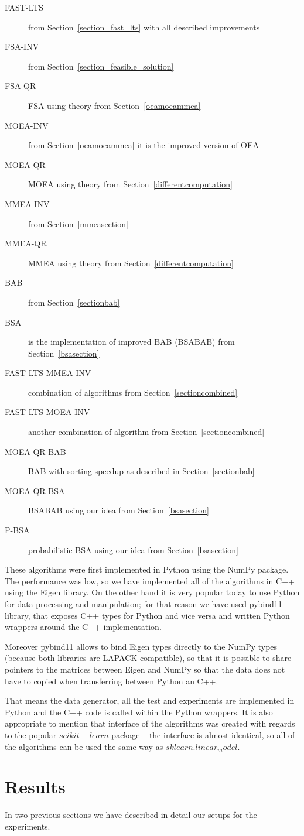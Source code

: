 \begin{description}
    \item[FAST-LTS] from Section~\ref{section_fast_lts} with all described improvements
    \item[FSA-INV] from Section~\ref{section_feasible_solution}
    \item[FSA-QR] FSA using theory from Section~\ref{oeamoeammea}
    \item[MOEA-INV] from Section~\ref{oeamoeammea} it is the improved version of OEA
    \item[MOEA-QR] MOEA using theory from Section~\ref{differentcomputation}
    \item[MMEA-INV] from Section~\ref{mmeasection}
    \item[MMEA-QR] MMEA using theory from Section~\ref{differentcomputation}
    \item[BAB] from Section~\ref{sectionbab}
    \item[BSA] is the implementation of improved BAB (BSABAB) from Section~\ref{bsasection}
    \item[FAST-LTS-MMEA-INV] combination of algorithms from Section~\ref{sectioncombined}
    \item[FAST-LTS-MOEA-INV] another combination of algorithm from Section~\ref{sectioncombined}
    \item[MOEA-QR-BAB] BAB with sorting speedup as described in Section~\ref{sectionbab}
    \item[MOEA-QR-BSA] BSABAB using our idea from Section~\ref{bsasection}
    \item[P-BSA] probabilistic BSA using our idea from Section~\ref{bsasection}
\end{description}

These algorithms were first implemented in Python using the NumPy package. The performance was low, so we have implemented all of the algorithms in C++ using the Eigen library. On the other hand it is very popular today to use Python for data processing and manipulation; for that reason we have used pybind11 library, that exposes C++ types for Python and vice versa and written Python wrappers around the C++ implementation. 

Moreover pybind11 allows to bind Eigen types directly to the NumPy types (because both libraries are LAPACK compatible), so that it is possible to share pointers to the matrices between Eigen and NumPy so that the data does not have to copied when transferring between Python an C++.

That means the data generator, all the test and experiments are implemented in Python and the C++ code is called within the Python wrappers. It is also appropriate to mention that interface of the algorithms was created with regards to the popular $scikit-learn$ package -- the interface is almost identical, so all of the algorithms can be used the same way as $sklearn.linear_model$.


\section{Results}
In two previous sections we have described in detail our setups for the experiments. 
